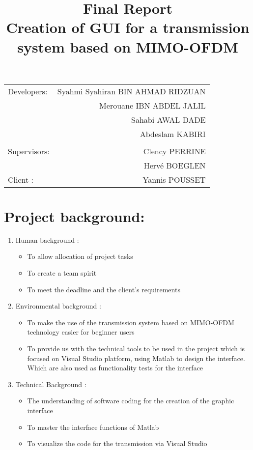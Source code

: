 \documentclass[12pt,a4paper]{article}
\begin{document}
\title{\textbf {\huge Final Report\\ Creation of GUI for a transmission system based on MIMO-OFDM}}
\maketitle

\begin{center}
\begin{tabular}{l r}
 
Developers: & Syahmi Syahiran BIN AHMAD RIDZUAN \\
& Merouane IBN ABDEL JALIL \\
& Sahabi AWAL DADE \\ 
& Abdeslam KABIRI\\ %
\\
Supervisors: &  Clency PERRINE \\ 
& Herv\'e BOEGLEN \\ %
Client : & Yannis POUSSET \\	
\end{tabular}
\end{center}

\clearpage
\section{Project background:}
\begin{enumerate}
\item Human background :
\begin{itemize}
\item To allow allocation of project tasks
\item To create a team spirit
\item To meet the deadline and the client's requirements
\end{itemize}
\item Environmental background :
\begin{itemize}
\item To make the use of the transmission system based on MIMO-OFDM technology easier for beginner users
\item To provide us with the technical tools to be used in the project which is focused on Visual Studio platform, using Matlab to design the interface. Which are also used as functionality tests for the interface
\end{itemize}
\clearpage
\item Technical Background :
\begin{itemize}
\item The understanding of software coding for the creation of the graphic interface
\item To master the interface functions of Matlab
\item To visualize the code for the transmission via Visual Studio
\end{itemize}
\end{enumerate}
\end{document}
